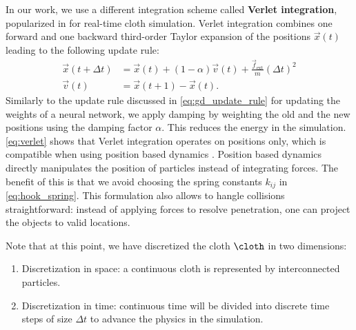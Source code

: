 \documentclass[\home/main.tex]{subfiles}
\begin{document}
In our work, we use a different integration scheme called \textbf{Verlet integration}, popularized in \autocite{Jakobsen2001} for real-time cloth simulation. Verlet integration combines one forward and one backward third-order Taylor expansion of the positions $\vec{x}(t)$ leading to the following update rule:
\begin{equation} \label{eq:verlet}
    \begin{aligned}
        \vec{x}(t + \Delta t) & = \vec{x}(t) + (1 - \alpha) \vec{v}(t) + \frac{\vec{f}_{\text{ext}}}{m} {(\Delta t)}^2 \\
        \vec{v}(t)            & = \vec{x}(t + 1) - \vec{x}(t).
    \end{aligned}
\end{equation}
Similarly to the update rule discussed in \cref{eq:gd_update_rule} for updating the weights of a neural network, we apply damping by weighting the old and the new positions using the damping factor $\alpha$. This reduces the energy in the simulation.
\cref{eq:verlet} shows that Verlet integration operates on positions only, which is compatible when using position based dynamics \autocite{muller2007position}. Position based dynamics directly manipulates the position of particles instead of integrating forces. The benefit of this is that we avoid choosing the spring constants $k_{ij}$ in \cref{eq:hook_spring}. This formulation also allows to hangle collisions straightforward: instead of applying forces to resolve penetration, one can project the objects to valid locations.

Note that at this point, we have discretized the cloth $\cloth$ in two dimensions:
\begin{enumerate}
    \item Discretization in space: a continuous cloth is represented by interconnected particles.
    \item Discretization in time: continuous time will be divided into discrete time steps of size $\Delta t$ to advance the physics in the simulation.
\end{enumerate}
\end{document}
